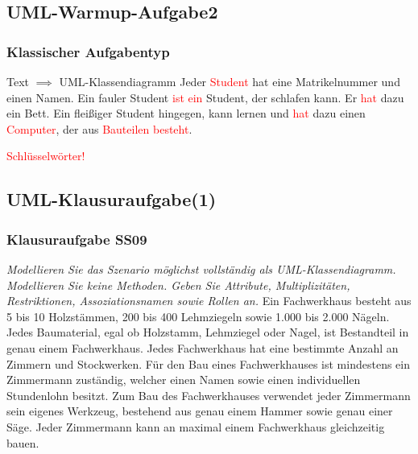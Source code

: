 \documentclass[18pt]{beamer}
\begin{document}
	\subsection{UML-Warmup-Aufgabe2}
	\begin{frame}
	\frametitle{Klassischer Aufgabentyp}
	\begin{exampleblock}{Text $\implies$ UML-Klassendiagramm}
		Jeder \textcolor{red}{Student} hat eine Matrikelnummer und einen Namen. Ein fauler Student \textcolor{red}{ist ein} Student, der schlafen kann. Er \textcolor{red}{hat} dazu ein Bett. Ein fleißiger Student hingegen, kann lernen und \textcolor{red}{hat} dazu einen \textcolor{red}{Computer}, der aus \textcolor{red}{Bauteilen} \textcolor{red}{besteht}.
	\end{exampleblock}
	\textcolor{red}{Schlüsselwörter!}
\end{frame}
	
	\subsection{UML-Klausuraufgabe(1)}
	\begin{frame}
		\frametitle{Klausuraufgabe SS09}
		\textit{Modellieren Sie das Szenario möglichst vollständig als UML-Klassendiagramm. Modellieren Sie keine Methoden. Geben Sie Attribute, Multiplizitäten, Restriktionen, Assoziationsnamen sowie Rollen an.} \linebreak
		Ein Fachwerkhaus besteht aus 5 bis 10 Holzstämmen, 200 bis 400 Lehmziegeln sowie 1.000 bis 2.000 Nägeln. Jedes Baumaterial, egal ob Holzstamm, Lehmziegel oder Nagel, ist Bestandteil in genau einem Fachwerkhaus. Jedes Fachwerkhaus hat eine bestimmte Anzahl an Zimmern und Stockwerken. Für den Bau eines Fachwerkhauses ist mindestens ein Zimmermann zuständig, welcher einen Namen sowie einen individuellen Stundenlohn besitzt. Zum Bau des Fachwerkhauses verwendet jeder Zimmermann sein eigenes Werkzeug, bestehend aus genau einem Hammer sowie genau einer Säge. Jeder Zimmermann kann an maximal einem Fachwerkhaus gleichzeitig bauen. 
	\end{frame}
	
\end{document}
